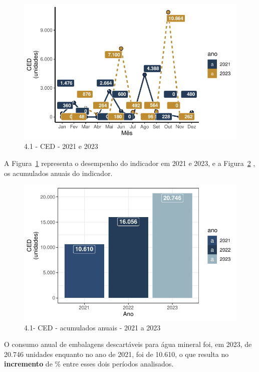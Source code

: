\documentclass[
  a4paper,
  DIV=11,
  numbers=noendperiod]{scrartcl}
\begin{document}
\begin{figure}[H]

{\centering \includegraphics{relatorio_2023_files/figure-pdf/fig-gced-1.pdf}

}

\caption{\label{fig-gced}4.1 - CED - 2021 e 2023}

\end{figure}

A Figura~\ref{fig-gced} representa o desempenho do indicador em 2021 e
2023, e a Figura~\ref{fig-gcedac} , os acumulados anuais do indicador.

\begin{figure}[H]

{\centering \includegraphics{relatorio_2023_files/figure-pdf/fig-gcedac-1.pdf}

}

\caption{\label{fig-gcedac}4.1- CED - acumulados anuais - 2021 a 2023}

\end{figure}

O consumo anual de embalagens descartáveis para água mineral foi, em
2023, de 20.746 unidades enquanto no ano de 2021, foi de 10.610, o que
resulta no \textbf{incremento} de \% entre esses dois
períodos analisados.
\end{document}
